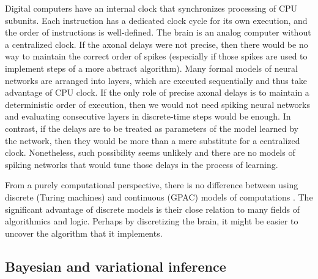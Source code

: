 \documentclass[12pt]{article}
\begin{document}
Digital computers have an internal clock that synchronizes processing of CPU subunits. Each instruction has a dedicated clock cycle for its own execution, and the order of instructions is well-defined. The brain is an analog computer without a centralized clock. If the axonal delays were not precise, then there would be no way to maintain the correct order of spikes (especially if those spikes are used to implement steps of a more abstract algorithm). Many formal models of neural networks are arranged into layers, which are executed sequentially and thus take advantage of CPU clock. If the only role of precise axonal delays is to maintain a deterministic order of execution, then we would not need spiking neural networks and evaluating consecutive layers in discrete-time steps would be enough. In contrast, if the delays are to be treated as parameters of the model learned by the network, then they would be more than a mere substitute for a centralized clock. Nonetheless, such possibility seems unlikely and there are no models of spiking networks that would tune those delays in the process of learning. 

From a purely computational perspective, there is no difference between using discrete (Turing machines) and continuous (GPAC) models of computations \cite{BOURNEZ2007317,Bournez2008}. The significant advantage of discrete models is their close relation to many fields of algorithmics and logic. Perhaps by discretizing the brain, it might be easier to uncover the algorithm that it implements. 


\subsection{Bayesian and variational inference}
\end{document}
